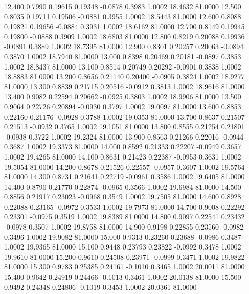   12.400   0.7990   0.19615   0.19348  -0.0878   0.3983   1.0002  18.4632  81.0000
  12.500   0.8035   0.19711   0.19506  -0.0881   0.3955   1.0002  18.5443  81.0000
  12.600   0.8088   0.19821   0.19656  -0.0884   0.3931   1.0002  18.6162  81.0000
  12.700   0.8149   0.19945   0.19800  -0.0888   0.3909   1.0002  18.6803  81.0000
  12.800   0.8219   0.20088   0.19936  -0.0891   0.3889   1.0002  18.7395  81.0000
  12.900   0.8301   0.20257   0.20063  -0.0894   0.3870   1.0002  18.7940  81.0000
  13.000   0.8398   0.20469   0.20181  -0.0897   0.3853   1.0002  18.8437  81.0000
  13.100   0.8514   0.20749   0.20292  -0.0901   0.3838   1.0002  18.8883  81.0000
  13.200   0.8656   0.21140   0.20400  -0.0905   0.3824   1.0002  18.9277  81.0000
  13.300   0.8839   0.21715   0.20516  -0.0912   0.3813   1.0002  18.9616  81.0000
  13.400   0.9082   0.22594   0.20662  -0.0925   0.3803   1.0002  18.9906  81.0000
  13.500   0.9064   0.22726   0.20894  -0.0930   0.3797   1.0002  19.0097  81.0000
  13.600   0.8853   0.22160   0.21176  -0.0928   0.3788   1.0002  19.0353  81.0000
  13.700   0.8637   0.21507   0.21513  -0.0932   0.3765   1.0002  19.1051  81.0000
  13.800   0.8555   0.21254   0.21801  -0.0938   0.3722   1.0002  19.2324  81.0000
  13.900   0.8563   0.21266   0.22016  -0.0944   0.3687   1.0002  19.3373  81.0000
  14.000   0.8592   0.21333   0.22207  -0.0949   0.3657   1.0002  19.4265  81.0000
  14.100   0.8631   0.21423   0.22387  -0.0953   0.3631   1.0002  19.5054  81.0000
  14.200   0.8678   0.21526   0.22557  -0.0957   0.3607   1.0002  19.5764  81.0000
  14.300   0.8731   0.21641   0.22719  -0.0961   0.3586   1.0002  19.6405  81.0000
  14.400   0.8790   0.21770   0.22874  -0.0965   0.3566   1.0002  19.6984  81.0000
  14.500   0.8856   0.21917   0.23023  -0.0968   0.3549   1.0002  19.7505  81.0000
  14.600   0.8928   0.22088   0.23165  -0.0972   0.3533   1.0002  19.7973  81.0000
  14.700   0.9008   0.22292   0.23301  -0.0975   0.3519   1.0002  19.8389  81.0000
  14.800   0.9097   0.22541   0.23432  -0.0978   0.3507   1.0002  19.8758  81.0000
  14.900   0.9198   0.22855   0.23560  -0.0982   0.3496   1.0002  19.9082  81.0000
  15.000   0.9313   0.23260   0.23688  -0.0986   0.3487   1.0002  19.9365  81.0000
  15.100   0.9448   0.23793   0.23822  -0.0992   0.3478   1.0002  19.9610  81.0000
  15.200   0.9610   0.24508   0.23971  -0.0999   0.3471   1.0002  19.9822  81.0000
  15.300   0.9783   0.25385   0.24161  -0.1010   0.3465   1.0002  20.0011  81.0000
  15.400   0.9642   0.24919   0.24466  -0.1013   0.3461   1.0002  20.0138  81.0000
  15.500   0.9492   0.24348   0.24806  -0.1019   0.3453   1.0002  20.0361  81.0000

